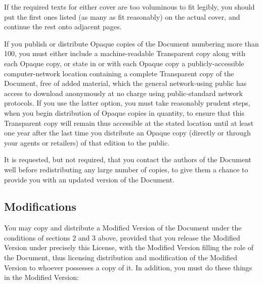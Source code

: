 	If the required texts for either cover are too voluminous to fit legibly, you should put the first ones listed (as many as fit reasonably) on the actual cover, and continue the rest onto adjacent pages. 

	If you publish or distribute Opaque copies of the Document numbering more than 100, you must either include a machine-readable Transparent copy along with each Opaque copy, or state in or with each Opaque copy a publicly-accessible computer-network location containing a complete Transparent copy of the Document, free of added material, which the general network-using public has access to download anonymously at no charge using public-standard network protocols. If you use the latter option, you must take reasonably prudent steps, when you begin distribution of Opaque copies in quantity, to ensure that this Transparent copy will remain thus accessible at the stated location until at least one year after the last time you distribute an Opaque copy (directly or through your agents or retailers) of that edition to the public. 

	It is requested, but not required, that you contact the authors of the Document well before redistributing any large number of copies, to give them a chance to provide you with an updated version of the Document. 

	\subsection{Modifications}

	You may copy and distribute a Modified Version of the Document under the conditions of sections 2 and 3 above, provided that you release the Modified Version under precisely this License, with the Modified Version filling the role of the Document, thus licensing distribution and modification of the Modified Version to whoever possesses a copy of it. In addition, you must do these things in the Modified Version: 
	
